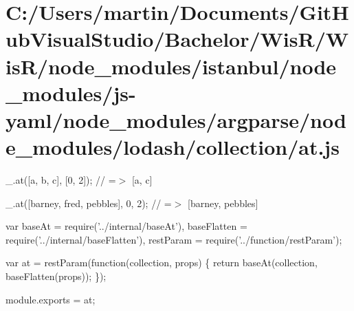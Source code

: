 \hypertarget{_c_1_2_users_2martin_2_documents_2_git_hub_visual_studio_2_bachelor_2_wis_r_2_wis_r_2node_module6de1bde3dbafdb29de256423e58a698b}{}\section{C\+:/\+Users/martin/\+Documents/\+Git\+Hub\+Visual\+Studio/\+Bachelor/\+Wis\+R/\+Wis\+R/node\+\_\+modules/istanbul/node\+\_\+modules/js-\/yaml/node\+\_\+modules/argparse/node\+\_\+modules/lodash/collection/at.\+js}
\+\_\+.\+at(\mbox{[}\textquotesingle{}a\textquotesingle{}, \textquotesingle{}b\textquotesingle{}, \textquotesingle{}c\textquotesingle{}\mbox{]}, \mbox{[}0, 2\mbox{]}); // =$>$ \mbox{[}\textquotesingle{}a\textquotesingle{}, \textquotesingle{}c\textquotesingle{}\mbox{]}

\+\_\+.\+at(\mbox{[}\textquotesingle{}barney\textquotesingle{}, \textquotesingle{}fred\textquotesingle{}, \textquotesingle{}pebbles\textquotesingle{}\mbox{]}, 0, 2); // =$>$ \mbox{[}\textquotesingle{}barney\textquotesingle{}, \textquotesingle{}pebbles\textquotesingle{}\mbox{]}


\begin{DoxyCodeInclude}
var baseAt = require(\textcolor{stringliteral}{'../internal/baseAt'}),
    baseFlatten = require(\textcolor{stringliteral}{'../internal/baseFlatten'}),
    restParam = require(\textcolor{stringliteral}{'../function/restParam'});

var at = restParam(\textcolor{keyword}{function}(collection, props) \{
  \textcolor{keywordflow}{return} baseAt(collection, baseFlatten(props));
\});

module.exports = at;
\end{DoxyCodeInclude}
 